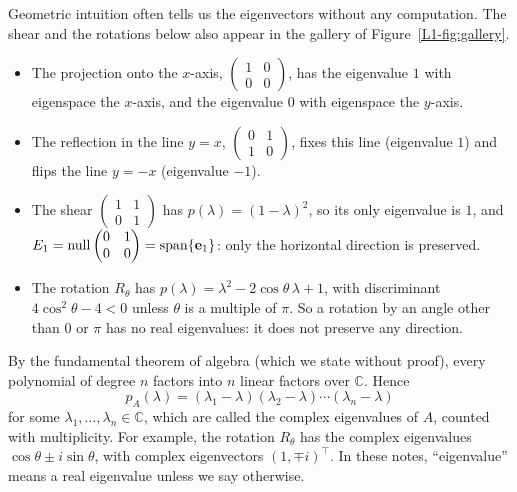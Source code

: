\begin{example}\label{L1-ex:eigen-geometric}
    Geometric intuition often tells us the eigenvectors without any computation. The shear and the rotations below also appear in the gallery of Figure~\ref{L1-fig:gallery}.
    \begin{itemize}
        \item The projection onto the $x$-axis, $\begin{pmatrix} 1 & 0 \\ 0 & 0 \end{pmatrix}$, has the eigenvalue $1$ with eigenspace the $x$-axis, and the eigenvalue $0$ with eigenspace the $y$-axis.
        \item The reflection in the line $y = x$, $\begin{pmatrix} 0 & 1 \\ 1 & 0 \end{pmatrix}$, fixes this line (eigenvalue $1$) and flips the line $y = -x$ (eigenvalue $-1$).
        \item The shear $\begin{pmatrix} 1 & 1 \\ 0 & 1 \end{pmatrix}$ has $p(\lambda) = (1 - \lambda)^2$, so its only eigenvalue is $1$, and $E_1 = \operatorname{null} \begin{pmatrix} 0 & 1 \\ 0 & 0 \end{pmatrix} = \operatorname{span}\{\mathbf{e}_1\}$: only the horizontal direction is preserved.
        \item The rotation $R_\theta$ has $p(\lambda) = \lambda^2 - 2\cos\theta\, \lambda + 1$, with discriminant $4\cos^2\theta - 4 < 0$ unless $\theta$ is a multiple of $\pi$. So a rotation by an angle other than $0$ or $\pi$ has no real eigenvalues: it does not preserve any direction.
    \end{itemize}
\end{example}

\begin{remark}
    By the fundamental theorem of algebra (which we state without proof), every polynomial of degree $n$ factors into $n$ linear factors over $\mathbb{C}$. Hence
    \[p_A(\lambda) = (\lambda_1 - \lambda)(\lambda_2 - \lambda) \cdots (\lambda_n - \lambda)\]
    for some $\lambda_1, \ldots, \lambda_n \in \mathbb{C}$, which are called the complex eigenvalues of $A$, counted with multiplicity. For example, the rotation $R_\theta$ has the complex eigenvalues $\cos\theta \pm i\sin\theta$, with complex eigenvectors $(1, \mp i)^\top$. In these notes, ``eigenvalue'' means a real eigenvalue unless we say otherwise.
\end{remark}

